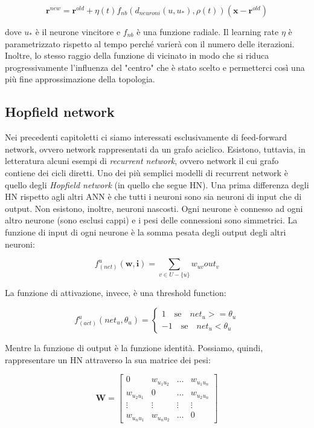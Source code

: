 \documentclass[10pt,a4paper]{article}
\newcommand{\ww}{\mathbf{w}}
\newcommand{\ii}{\mathbf{i}}
\begin{document}
$$
\mathbf{r}^{new} = \mathbf{r}^{old} + \eta(t)f_{nb}(d_{neuroni}(u,u_*),\rho(t))(\mathbf{x} - \mathbf{r}^{old})
$$

dove $u_*$ è il neurone vincitore e $f_{nb}$ è una funzione radiale. Il learning rate $\eta$ è parametrizzato rispetto al tempo perché varierà con il numero delle iterazioni. Inoltre, lo stesso raggio della funzione di vicinato in modo che si riduca progressivamente l'influenza del "centro" che è stato scelto e permetterci così una più fine approssimazione della topologia.

\subsection{Hopfield network}

Nei precedenti capitoletti ci siamo interessati esclusivamente di feed-forward network, ovvero network rappresentati da un grafo aciclico. Esistono, tuttavia, in letteratura alcuni esempi di \emph{recurrent network}, ovvero network il cui grafo contiene dei cicli diretti. Uno dei più semplici modelli di recurrent network è quello degli \emph{Hopfield network} (in quello che segue HN). Una prima differenza degli HN rispetto agli altri ANN è che tutti i neuroni sono sia neuroni di input che di output. Non esistono, inoltre, neuroni nascosti. Ogni neurone è connesso ad ogni altro neurone (sono esclusi cappi) e i pesi delle connessioni sono simmetrici. La funzione di input di ogni neurone è la somma pesata degli output degli altri neuroni:

$$
f_{(net)}^u(\ww,\ii) = \sum_{v \in U - \{u\}} w_{uv} out_v 
$$

La funzione di attivazione, invece, è una threshold function:

$$
f_{(act)}^u(net_u,\theta_u) = \begin{cases}
				1 \quad \text{se} \quad net_u >= \theta_u \\
				-1 \quad \text{se} \quad net_u < \theta_u
							  \end{cases}
$$

Mentre la funzione di output è la funzione identità. Possiamo, quindi, rappresentare un HN attraverso la sua matrice dei pesi:

$$
\mathbf{W} = \begin{bmatrix} 
			0 & w_{u_1 u_2} & \dots & w_{u_1 u_n} \\
			w_{u_2 u_1} & 0 & \dots & w_{u_2 u_n} \\
			\vdots & \vdots & \vdots & \vdots \\
			w_{u_n u_1} & w_{u_n u_2} & \dots & 0
			\end{bmatrix}
$$
\end{document}
